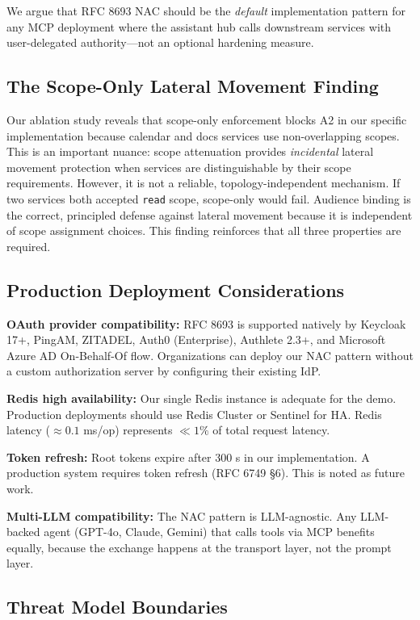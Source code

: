 \documentclass[journal]{IEEEtran}
\begin{document}
We argue that RFC 8693 NAC should be the \textit{default} implementation pattern for any MCP deployment where the assistant hub calls downstream services with user-delegated authority—not an optional hardening measure.

\subsection{The Scope-Only Lateral Movement Finding}

Our ablation study reveals that scope-only enforcement blocks A2 in our specific implementation because calendar and docs services use non-overlapping scopes. This is an important nuance: scope attenuation provides \textit{incidental} lateral movement protection when services are distinguishable by their scope requirements. However, it is not a reliable, topology-independent mechanism. If two services both accepted \texttt{read} scope, scope-only would fail. Audience binding is the correct, principled defense against lateral movement because it is independent of scope assignment choices. This finding reinforces that all three properties are required.

\subsection{Production Deployment Considerations}

\textbf{OAuth provider compatibility:} RFC 8693 is supported natively by Keycloak 17+, PingAM, ZITADEL, Auth0 (Enterprise), Authlete 2.3+, and Microsoft Azure AD On-Behalf-Of flow. Organizations can deploy our NAC pattern without a custom authorization server by configuring their existing IdP.

\textbf{Redis high availability:} Our single Redis instance is adequate for the demo. Production deployments should use Redis Cluster or Sentinel for HA. Redis latency ($\approx 0.1$ ms/op) represents $\ll 1\%$ of total request latency.

\textbf{Token refresh:} Root tokens expire after 300 s in our implementation. A production system requires token refresh (RFC 6749 §6). This is noted as future work.

\textbf{Multi-LLM compatibility:} The NAC pattern is LLM-agnostic. Any LLM-backed agent (GPT-4o, Claude, Gemini) that calls tools via MCP benefits equally, because the exchange happens at the transport layer, not the prompt layer.

\subsection{Threat Model Boundaries}
\end{document}
